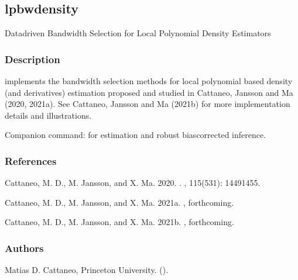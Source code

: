 \documentclass[letterpaper,10pt,english]{sphinxmanual}
\begin{document}
\sphinxstepscope


\subsection{lpbwdensity}
\label{\detokenize{lpbwdensity:lpbwdensity}}\label{\detokenize{lpbwdensity::doc}}
\sphinxAtStartPar
Data\sphinxhyphen{}driven Bandwidth Selection for Local Polynomial Density Estimators


\subsubsection{Description}
\label{\detokenize{lpbwdensity:description}}
\sphinxAtStartPar
{} implements the bandwidth selection methods for local
polynomial based density (and derivatives) estimation proposed and studied
in Cattaneo, Jansson and Ma (2020, 2021a).
See Cattaneo, Jansson and Ma (2021b) for more implementation details and illustrations.

\sphinxAtStartPar
Companion command:  for estimation and robust bias\sphinxhyphen{}corrected inference.


\subsubsection{References}
\label{\detokenize{lpbwdensity:references}}
\sphinxAtStartPar
Cattaneo, M. D., M. Jansson, and X. Ma. 2020.
.
, 115(531): 1449\sphinxhyphen{}1455.

\sphinxAtStartPar
Cattaneo, M. D., M. Jansson, and X. Ma. 2021a.
, forthcoming.

\sphinxAtStartPar
Cattaneo, M. D., M. Jansson, and X. Ma. 2021b.
, forthcoming.


\subsubsection{Authors}
\label{\detokenize{lpbwdensity:authors}}
\sphinxAtStartPar
Matias D. Cattaneo, Princeton University. ().
\end{document}

